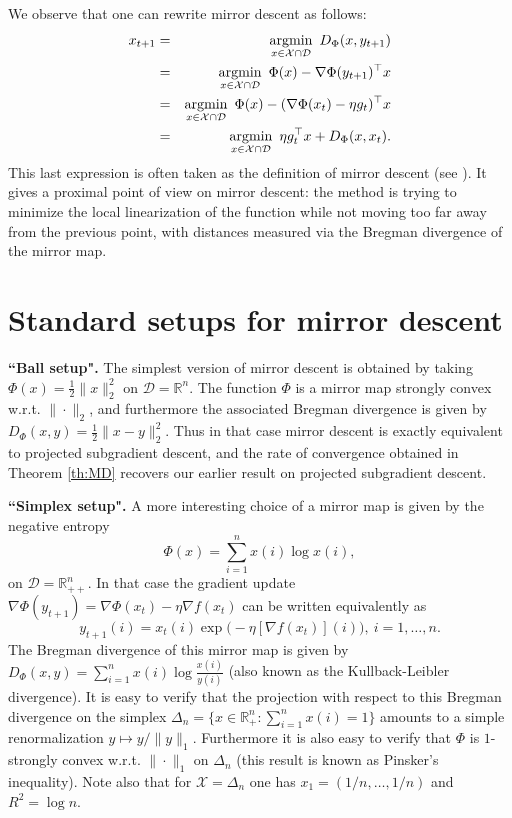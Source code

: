 \documentclass[openany]{now}
\newcommand{\argmin}{\mathop{\mathrm{argmin}}}
\begin{document}
We observe that one can rewrite mirror descent as follows:
\begin{eqnarray}
x_{t+1} & = & \argmin_{x \in \mathcal{X} \cap \mathcal{D}} \ D_{\Phi}(x,y_{t+1}) \notag \\
& = & \argmin_{x \in \mathcal{X} \cap \mathcal{D}} \ \Phi(x) - \nabla \Phi(y_{t+1})^{\top} x \label{eq:MD3} \\
& = & \argmin_{x \in \mathcal{X} \cap \mathcal{D}} \ \Phi(x) - (\nabla \Phi(x_{t}) - \eta g_t)^{\top} x \notag \\
& = & \argmin_{x \in \mathcal{X} \cap \mathcal{D}} \ \eta g_t^{\top} x + D_{\Phi}(x,x_t) . \label{eq:MDproxview}
\end{eqnarray}
This last expression is often taken as the definition of mirror descent (see \cite{BT03}). It gives a proximal point of view on mirror descent: the method is trying to minimize the local linearization of the function while not moving too far away from the previous point, with distances measured via the Bregman divergence of the mirror map.

\section{Standard setups for mirror descent} \label{sec:mdsetups}
\noindent \textbf{``Ball setup".} The simplest version of mirror descent is obtained by taking $\Phi(x) = \frac{1}{2} \|x\|^2_2$ on $\mathcal{D} = \mathbb{R}^n$. The function $\Phi$ is a mirror map strongly convex w.r.t. $\|\cdot\|_2$, and furthermore the associated Bregman divergence is given by $D_{\Phi}(x,y) = \frac{1}{2} \|x - y\|^2_2$. Thus in that case mirror descent is exactly equivalent to projected subgradient descent, and the rate of convergence obtained in Theorem \ref{th:MD} recovers our earlier result on projected subgradient descent.
\newline

\noindent
\textbf{``Simplex setup".} A more interesting choice of a mirror map is given by the negative entropy
$$\Phi(x) = \sum_{i=1}^n x(i) \log x(i),$$
on $\mathcal{D} = \mathbb{R}_{++}^n$. In that case the gradient update $\nabla \Phi(y_{t+1}) = \nabla \Phi(x_t) - \eta \nabla f(x_t)$ can be written equivalently as
$$y_{t+1}(i) = x_{t}(i) \exp\big(- \eta [\nabla f(x_t) ](i) \big) , \ i=1, \hdots, n.$$
The Bregman divergence of this mirror map is given by $D_{\Phi}(x,y) = \sum_{i=1}^n x(i) \log \frac{x(i)}{y(i)}$ (also known as the Kullback-Leibler divergence). It is easy to verify that the projection with respect to this Bregman divergence on the simplex $\Delta_n = \{x \in \mathbb{R}_+^n : \sum_{i=1}^n x(i) = 1\}$ amounts to a simple renormalization $y \mapsto y / \|y\|_1$. Furthermore it is also easy to verify that $\Phi$ is $1$-strongly convex w.r.t. $\|\cdot\|_1$ on $\Delta_n$ (this result is known as Pinsker's inequality). Note also that for $\mathcal{X} = \Delta_n$ one has $x_1 = (1/n, \hdots, 1/n)$ and $R^2 = \log n$.
\end{document}
